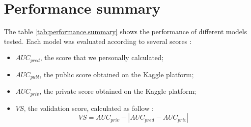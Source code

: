 \section{Performance summary} \label{sec:performance}

The table \ref{tab:performance.summary} shows the performance of different models tested. Each model was evaluated according to several scores :
\begin{itemize}
    \item $AUC_{pred}$, the score that we personally calculated;
    \item $AUC_{publ}$, the public score obtained on the Kaggle platform;
    \item $AUC_{priv}$, the private score obtained on the Kaggle platform;
    \item $VS$, the validation score, calculated as follow :
    $$
    VS = AUC_{priv} - \left | AUC_{pred} - AUC_{priv} \right |
    $$
\end{itemize}

